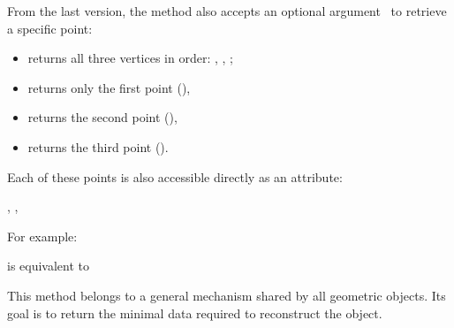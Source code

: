 \medskip
\noindent
From the last version, the method also accepts an optional argument~ to retrieve a specific point:
\begin{itemize}
  \item {} returns all three vertices in order: , , ;
  \item {} returns only the first point (),
  \item {} returns the second point (),
  \item {} returns the third point ().
\end{itemize}

\medskip
\noindent
Each of these points is also accessible directly as an attribute:
\begin{center}
, , 
\end{center}
For example:
\begin{center}
 is equivalent to 
\end{center}

\medskip
\noindent
This method belongs to a general mechanism shared by all geometric objects. Its goal is to return the minimal data required to reconstruct the object.

\vspace{1em}

\begin{minipage}{.5\textwidth}
\let\tul\tkzUseLua
\begin{center}
\end{center}
\end{minipage}
\begin{minipage}{.5\textwidth}
\begin{tkzexample}
\end{tkzexample}
\end{minipage}

